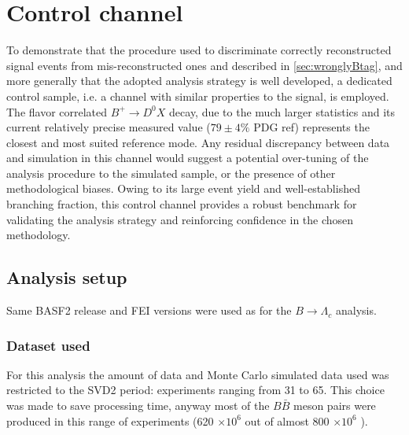 \chapter{Control channel}


To demonstrate that the procedure used to discriminate correctly reconstructed signal events from mis-reconstructed ones and described in \ref{sec:wronglyBtag}, 
and more generally that the adopted analysis strategy is well developed, a dedicated control sample,  i.e. a channel with similar properties to the signal,
is employed.  The flavor correlated $B^+ \rightarrow D^0 X$ decay, due to the much larger statistics and its current relatively precise measured value ($79 \pm 4 \%$  PDG ref)
 represents the closest and most suited reference mode. Any residual discrepancy between data and simulation in this channel would
 suggest a potential over-tuning of the analysis procedure to the simulated sample, or the
 presence of other methodological biases. Owing to its large event yield and well-established
 branching fraction, this control channel provides a robust benchmark for validating the
 analysis strategy and reinforcing confidence in the chosen methodology.\\

\section{Analysis setup} 
Same BASF2 release and FEI versions were used as for the $B \rightarrow \Lambda_c$ analysis.
\subsection{Dataset used}

   For this analysis the amount of data and Monte Carlo simulated data used was restricted to the SVD2 period: 
   experiments ranging from 31 to 65. This choice was made to save processing time, anyway most of the $B\bar{B}$ meson pairs were produced in this range of experiments 
   (620 $\times 10^6$ out of almost 800 $\times 10^6$ ).
   
